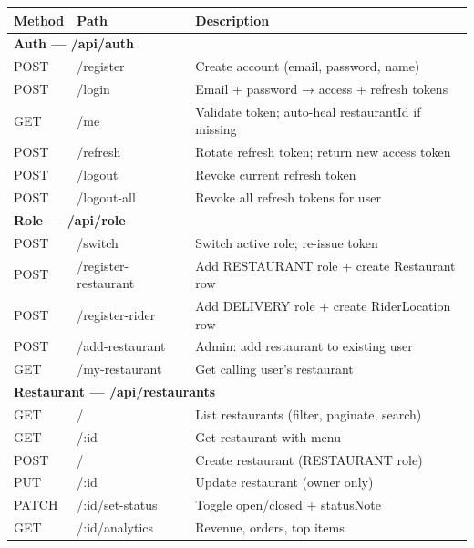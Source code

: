 \documentclass[11pt,a4paper,twoside]{book}
\newcommand{\th}[1]{\textbf{\color{white}#1}}
\begin{document}
\begin{center}\footnotesize
\begin{longtable}{p{1.5cm}p{5cm}p{6cm}}
\toprule
\rowcolor{headbg}\th{Method} & \th{Path} & \th{Description} \\
\midrule
\multicolumn{3}{l}{\textbf{Auth — /api/auth}} \\
\midrule
POST & /register               & Create account (email, password, name) \\
\rowcolor{rowalt}POST & /login                  & Email + password → access + refresh tokens \\
GET  & /me                     & Validate token; auto-heal restaurantId if missing \\
\rowcolor{rowalt}POST & /refresh                & Rotate refresh token; return new access token \\
POST & /logout                 & Revoke current refresh token \\
\rowcolor{rowalt}POST & /logout-all             & Revoke all refresh tokens for user \\
\midrule
\multicolumn{3}{l}{\textbf{Role — /api/role}} \\
\midrule
POST & /switch                 & Switch active role; re-issue token \\
\rowcolor{rowalt}POST & /register-restaurant    & Add RESTAURANT role + create Restaurant row \\
POST & /register-rider         & Add DELIVERY role + create RiderLocation row \\
\rowcolor{rowalt}POST & /add-restaurant         & Admin: add restaurant to existing user \\
GET  & /my-restaurant          & Get calling user's restaurant \\
\midrule
\multicolumn{3}{l}{\textbf{Restaurant — /api/restaurants}} \\
\midrule
GET  & /                       & List restaurants (filter, paginate, search) \\
\rowcolor{rowalt}GET  & /:id                    & Get restaurant with menu \\
POST & /                       & Create restaurant (RESTAURANT role) \\
\rowcolor{rowalt}PUT  & /:id                    & Update restaurant (owner only) \\
PATCH & /:id/set-status        & Toggle open/closed + statusNote \\
\rowcolor{rowalt}GET  & /:id/analytics          & Revenue, orders, top items \\

\end{longtable}
\end{center}
\end{document}
